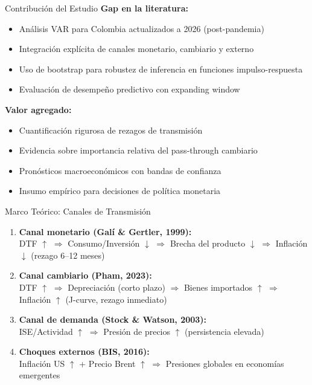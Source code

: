 \documentclass{beamer}
\begin{document}
\begin{frame}{Contribución del Estudio}
\textbf{Gap en la literatura:}
\begin{itemize}
\item Análisis VAR para Colombia actualizados a 2026 (post-pandemia)
\item Integración explícita de canales monetario, cambiario y externo
\item Uso de bootstrap para robustez de inferencia en funciones impulso-respuesta
\item Evaluación de desempeño predictivo con expanding window
\end{itemize}

\vspace{0.3cm}
\textbf{Valor agregado:}
\begin{itemize}
\item Cuantificación rigurosa de rezagos de transmisión
\item Evidencia sobre importancia relativa del pass-through cambiario
\item Pronósticos macroeconómicos con bandas de confianza
\item Insumo empírico para decisiones de política monetaria
\end{itemize}
\end{frame}

\begin{frame}{Marco Teórico: Canales de Transmisión}
\small
\begin{enumerate}
\item \textbf{Canal monetario (Galí \& Gertler, 1999):} \\
DTF $\uparrow$ $\Rightarrow$ Consumo/Inversión $\downarrow$ $\Rightarrow$ Brecha del producto $\downarrow$ $\Rightarrow$ Inflación $\downarrow$ (rezago 6--12 meses)

\item \textbf{Canal cambiario (Pham, 2023):} \\
DTF $\uparrow$ $\Rightarrow$ Depreciación (corto plazo) $\Rightarrow$ Bienes importados $\uparrow$ $\Rightarrow$ Inflación $\uparrow$ (J-curve, rezago inmediato)

\item \textbf{Canal de demanda (Stock \& Watson, 2003):} \\
ISE/Actividad $\uparrow$ $\Rightarrow$ Presión de precios $\uparrow$ (persistencia elevada)

\item \textbf{Choques externos (BIS, 2016):} \\
Inflación US $\uparrow$ + Precio Brent $\uparrow$ $\Rightarrow$ Presiones globales en economías emergentes
\end{enumerate}
\end{frame}
\end{document}

